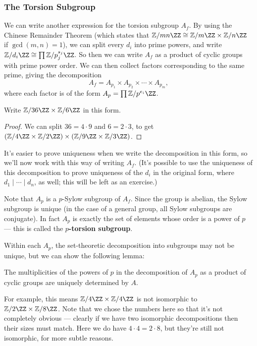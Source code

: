 \subsubsection{The Torsion Subgroup}

We can write another expression for the torsion subgroup $A_f$. By using the Chinese Remainder Theorem (which states that $\mathbb{Z}/mn\ZZ \cong \mathbb{Z}/m\ZZ \times \mathbb{Z}/n\ZZ$ if $\gcd(m, n) = 1$), we can split every $d_i$ into prime powers, and write $\mathbb{Z}/d_i\ZZ \cong \prod \mathbb{Z}/p_j^{s_j}\ZZ$. So then we can write $A_f$ as a product of cyclic groups with prime power order. We can then collect factors corresponding to the same prime, giving the decomposition \[A_f = A_{p_1} \times A_{p_2} \times \cdots \times A_{p_m},\] where each factor is of the form $A_p = \prod \mathbb{Z}/p^{e_i}\ZZ$. 

\begin{example}
    Write $\mathbb{Z}/36\ZZ \times \mathbb{Z}/6\ZZ$ in this form. 
\end{example}

\begin{proof}
    We can split $36 = 4\cdot 9$ and $6 = 2\cdot 3$, to get $(\mathbb{Z}/4\ZZ \times \mathbb{Z}/2\ZZ) \times (\mathbb{Z}/9\ZZ \times \mathbb{Z}/3\ZZ)$.
\end{proof}

It's easier to prove uniqueness when we write the decomposition in this form, so we'll now work with this way of writing $A_f$. (It's possible to use the uniqueness of this decomposition to prove uniqueness of the $d_i$ in the original form, where $d_1 \mid \cdots \mid d_n$, as well; this will be left as an exercise.)

Note that $A_p$ is a $p$-Sylow subgroup of $A_f$. Since the group is abelian, the Sylow subgroup is unique (in the case of a general group, all Sylow subgroups are conjugate). In fact $A_p$ is exactly the set of elements whose order is a power of $p$ --- this is called the \textbf{$p$-torsion subgroup}. 

Within each $A_p$, the set-theoretic decomposition into subgroups may not be unique, but we can show the following lemma:

\begin{lemma}
    The multiplicities of the powers of $p$ in the decomposition of $A_p$ as a product of cyclic groups are uniquely determined by $A$. 
\end{lemma}

For example, this means $\mathbb{Z}/4\ZZ \times \mathbb{Z}/4\ZZ$ is not isomorphic to $\mathbb{Z}/2\ZZ \times \mathbb{Z}/8\ZZ$. Note that we chose the numbers here so that it's not completely obvious --- clearly if we have two isomorphic decompositions then their sizes must match. Here we do have $4 \cdot 4 = 2 \cdot 8$, but they're still not isomorphic, for more subtle reasons.

